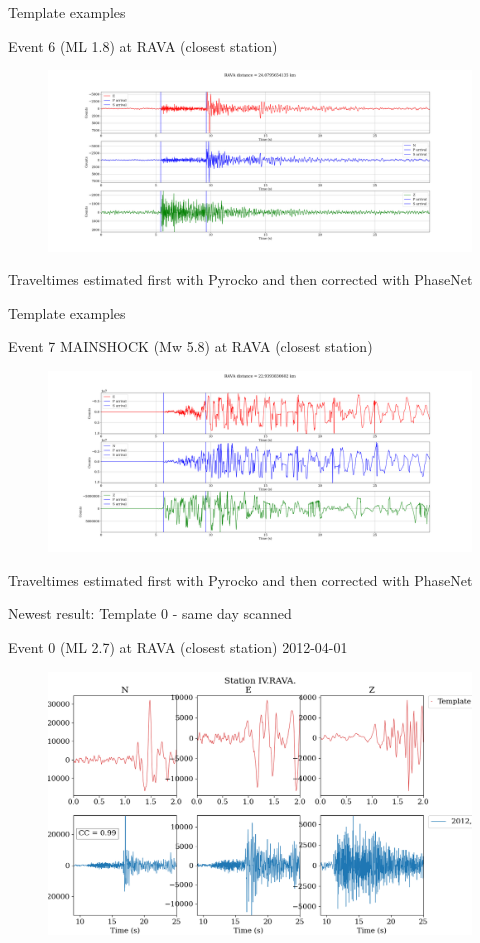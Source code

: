 \documentclass[aspectratio=43,9pt]{beamer}
\begin{document}
\begin{frame}{Template examples}

\centering Event 6 (ML 1.8) at RAVA (closest station)
\begin{figure}
 \includegraphics[width=1\linewidth]{figs/event_6_RAVA.png}
\end{figure}

Traveltimes estimated first with Pyrocko and then corrected with PhaseNet

\end{frame}


\begin{frame}{Template examples}

\centering Event 7 MAINSHOCK (Mw 5.8) at RAVA (closest station)
\begin{figure}
 \includegraphics[width=1\linewidth]{figs/event_7_RAVA.png}
\end{figure}

Traveltimes estimated first with Pyrocko and then corrected with PhaseNet

\end{frame}



\begin{frame}{Newest result: Template 0 - same day scanned}

\centering Event 0 (ML 2.7) at RAVA (closest station) 2012-04-01
\begin{figure}
 \includegraphics[width=1\linewidth]{figs/detections.png}
\end{figure}

\end{frame}
\end{document}
